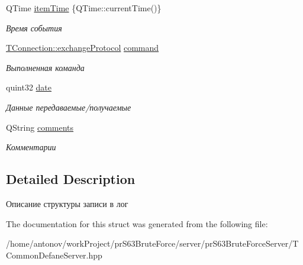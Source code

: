 \begin{DoxyCompactItemize}
\item 
\mbox{\label{structserver_1_1common_define_server_1_1log_item_a62068d18bca00d4469bf5f445b00deb3}} 
Q\+Time \hyperlink{structserver_1_1common_define_server_1_1log_item_a62068d18bca00d4469bf5f445b00deb3}{item\+Time} \{Q\+Time\+::current\+Time()\}
\begin{DoxyCompactList}\small\item\em Время события \end{DoxyCompactList}\item 
\mbox{\label{structserver_1_1common_define_server_1_1log_item_a0b30469f1b817d9ff74f3352ca12fcec}} 
\hyperlink{classconnection_1_1_t_connection_a3550181cb2fa72eccfa55d23f45cea34}{T\+Connection\+::exchange\+Protocol} \hyperlink{structserver_1_1common_define_server_1_1log_item_a0b30469f1b817d9ff74f3352ca12fcec}{command}
\begin{DoxyCompactList}\small\item\em Выполненная команда \end{DoxyCompactList}\item 
\mbox{\label{structserver_1_1common_define_server_1_1log_item_a2d5f25fbb673509e674f11d6a2d7f6c8}} 
quint32 \hyperlink{structserver_1_1common_define_server_1_1log_item_a2d5f25fbb673509e674f11d6a2d7f6c8}{date}
\begin{DoxyCompactList}\small\item\em Данные передаваемые/получаемые \end{DoxyCompactList}\item 
\mbox{\label{structserver_1_1common_define_server_1_1log_item_ad7b3a84a8b8852faf246683a96f26796}} 
Q\+String \hyperlink{structserver_1_1common_define_server_1_1log_item_ad7b3a84a8b8852faf246683a96f26796}{comments}
\begin{DoxyCompactList}\small\item\em Комментарии \end{DoxyCompactList}\end{DoxyCompactItemize}


\subsection{Detailed Description}
Описание структуры записи в лог 

The documentation for this struct was generated from the following file\+:\begin{DoxyCompactItemize}
\item 
/home/antonov/work\+Project/pr\+S63\+Brute\+Force/server/pr\+S63\+Brute\+Force\+Server/T\+Common\+Defane\+Server.\+hpp\end{DoxyCompactItemize}
